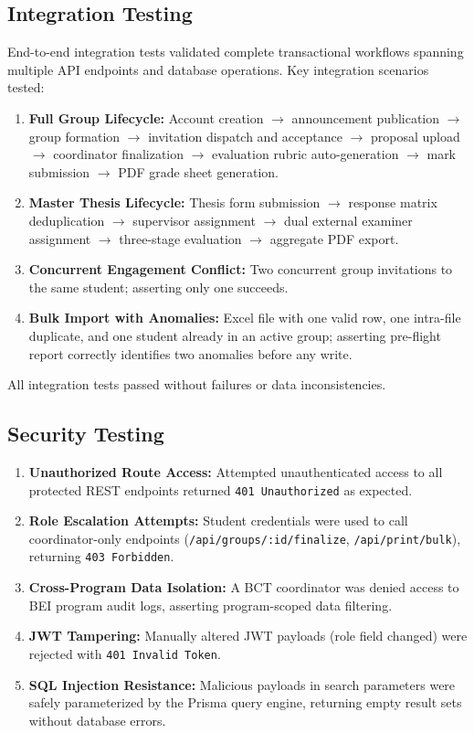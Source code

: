 \subsection{Integration Testing}
End-to-end integration tests validated complete transactional workflows spanning multiple API endpoints and database operations. Key integration scenarios tested:
\begin{enumerate}[label=\arabic*.]
    \item \textbf{Full Group Lifecycle:} Account creation $\rightarrow$ announcement publication $\rightarrow$ group formation $\rightarrow$ invitation dispatch and acceptance $\rightarrow$ proposal upload $\rightarrow$ coordinator finalization $\rightarrow$ evaluation rubric auto-generation $\rightarrow$ mark submission $\rightarrow$ PDF grade sheet generation.
    \item \textbf{Master Thesis Lifecycle:} Thesis form submission $\rightarrow$ response matrix deduplication $\rightarrow$ supervisor assignment $\rightarrow$ dual external examiner assignment $\rightarrow$ three-stage evaluation $\rightarrow$ aggregate PDF export.
    \item \textbf{Concurrent Engagement Conflict:} Two concurrent group invitations to the same student; asserting only one succeeds.
    \item \textbf{Bulk Import with Anomalies:} Excel file with one valid row, one intra-file duplicate, and one student already in an active group; asserting pre-flight report correctly identifies two anomalies before any write.
\end{enumerate}
All integration tests passed without failures or data inconsistencies.

\subsection{Security Testing}
\begin{enumerate}[label=\arabic*.]
    \item \textbf{Unauthorized Route Access:} Attempted unauthenticated access to all protected REST endpoints returned \texttt{401 Unauthorized} as expected.
    \item \textbf{Role Escalation Attempts:} Student credentials were used to call coordinator-only endpoints (\texttt{/api/groups/:id/finalize}, \texttt{/api/print/bulk}), returning \texttt{403 Forbidden}.
    \item \textbf{Cross-Program Data Isolation:} A BCT coordinator was denied access to BEI program audit logs, asserting program-scoped data filtering.
    \item \textbf{JWT Tampering:} Manually altered JWT payloads (role field changed) were rejected with \texttt{401 Invalid Token}.
    \item \textbf{SQL Injection Resistance:} Malicious payloads in search parameters were safely parameterized by the Prisma query engine, returning empty result sets without database errors.
\end{enumerate}

